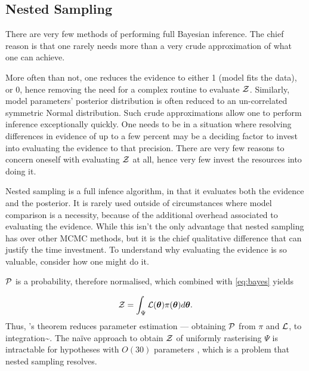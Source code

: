 \documentclass[draft,usenatbib]{mnras}
\begin{document}
\subsection{Nested Sampling}
\label{sec:org8d5afbf}

There are very few methods of performing full Bayesian
inference. The chief reason is that one rarely needs more than a
very crude approximation of what one can achieve.

More often than not, one reduces the evidence to either 1 (model
fits the data), or 0, hence removing the need for a complex routine
to evaluate \({\cal Z}\). Similarly, model parameters' posterior
distribution is often reduced to an un-correlated symmetric Normal
distribution. Such crude approximations allow one to perform
inference exceptionally quickly. One needs to be in a situation
where resolving differences in evidence of up to a few percent may
be a deciding factor to invest into evaluating the evidence to that
precision. There are very few reasons to concern oneself with
evaluating \({\cal Z}\) at all, hence very few invest the resources
into doing it.

Nested sampling is a full infence algorithm, in that it evaluates
both the evidence and the posterior. It is rarely used outside of
circumstances where model comparison is a necessity, because of the
additional overhead associated to evaluating the evidence. While
this isn't the only advantage that nested sampling has over other
MCMC methods, but it is the chief qualitative difference that can
justify the time investment. To understand why evaluating the
evidence is so valuable, consider how one might do it.

\({\cal P}\) is a probability, therefore normalised, which combined
with \cref{eq:bayes} yields

\begin{equation}
 \label{eq:def-z}
 {\cal Z} = \int_{\Psi} {\cal L}(\bm{\theta}) \pi(\bm{\theta}) d\bm{\theta}.
\end{equation}
Thus, \citeauthor{1763} 's theorem reduces parameter estimation ---
obtaining \({\cal P}\) from \(\pi\) and \({\cal L}\), to
integration\textasciitilde{}\citep{bayes-integration}. The naïve approach to obtain
\({\cal Z}\) of uniformly rasterising \(\Psi\) is intractable for
hypotheses with \(O(30)\) parameters \citep{Caflisch_1998}, which
is a problem that nested sampling resolves.
\end{document}
